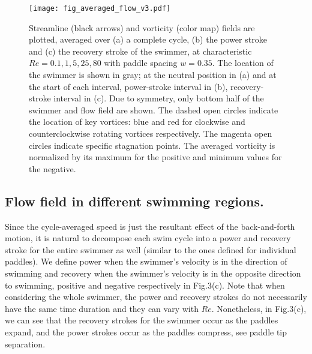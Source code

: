 \documentclass[%
 onecolumn,
superscriptaddress,
 amsmath,amssymb,
 aps,
longbibliography
]{revtex4-2}
\begin{document}
\begin{figure}
\texttt{[image: fig\_averaged\_flow\_v3.pdf]}
\caption{Streamline (black arrows) and vorticity (color map) fields are plotted, averaged over (a) a complete cycle, (b) the power stroke and (c) the recovery stroke of the swimmer, at characteristic $Re=0.1, 1, 5, 25, 80$ with paddle spacing $w = 0.35$. 
The location of the swimmer is shown in gray; at the neutral position in (a) and at the start of each interval, power-stroke interval in (b), recovery-stroke interval in (c). 
Due to symmetry, only bottom half of the swimmer and flow field are shown. 
The dashed open circles indicate the location of key vortices: blue and red for clockwise and counterclockwise rotating vortices respectively. The magenta open circles indicate specific stagnation points. The averaged vorticity is normalized by its maximum for the positive and minimum values for the negative.}
\label{fig:avgFlow}
\end{figure}



\subsection{Flow field in different swimming regions.}

Since the cycle-averaged speed is just the resultant effect of the back-and-forth motion, it is natural to decompose each swim cycle into a power and recovery stroke for the entire swimmer as well (similar to the ones defined for individual paddles). We define power when the swimmer's velocity is in the direction of swimming and recovery when the swimmer's velocity is in the opposite direction to swimming, positive and negative respectively in Fig.3(c). Note that when considering the whole swimmer, the power and recovery strokes do not necessarily have the same time duration and they can vary with $Re$. Nonetheless, in Fig.3(c), we can see that the recovery strokes for the swimmer occur as the paddles expand, and the power strokes occur as the paddles compress, see paddle tip separation. 
\end{document}

